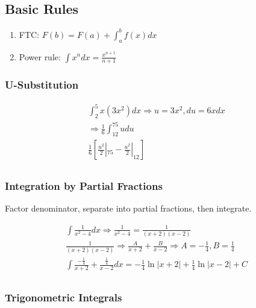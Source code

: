 \subsection{Basic Rules}\label{subsec:basic-rules}

\begin{enumerate}
    \item FTC: $F(b)=F(a)+\int_{a}^{b}f(x)dx$
    \item Power rule: $\int{x^n}dx=\frac{x^{n+1}}{n+1}$
\end{enumerate}

\subsubsection{U-Substitution}

\begin{gather*}
    \int_{2}^{5}x(3x^2)dx \Rightarrow u=3x^2, du=6xdx\\
    \Rightarrow \frac{1}{6}\int_{12}^{75}udu\\
    \frac{1}{6}[\frac{u^2}{2}|_{75}-\frac{u^2}{2}|_{12}]\\
\end{gather*}

\subsubsection{Integration by Partial Fractions}

Factor denominator, separate into partial fractions, then integrate.

\begin{gather*}
    \int{\frac{1}{x^2-4}}dx \Rightarrow \frac{1}{x^2-4}=\frac{1}{(x+2)(x-2)}\\
    \frac{1}{(x+2)(x-2)} \Rightarrow \frac{A}{x+2}+\frac{B}{x-2} \Rightarrow A=-\frac{1}{4}, B=\frac{1}{4}\\
    \int{\frac{-\frac{1}{4}}{x+2}+\frac{\frac{1}{4}}{x-2}}dx=-\frac{1}{4}\ln{|x+2|}+\frac{1}{4}\ln{|x-2|}+C\\
\end{gather*}

\subsubsection{Trigonometric Integrals}

